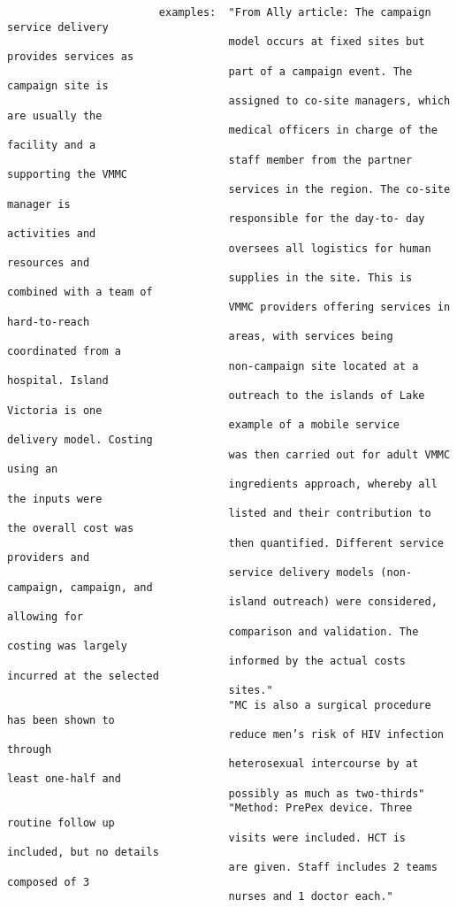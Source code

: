 \documentclass{article}
\begin{document}
\begin{verbatim}
                        examples:  "From Ally article: The campaign service delivery
                                   model occurs at fixed sites but provides services as
                                   part of a campaign event. The campaign site is
                                   assigned to co-site managers, which are usually the
                                   medical officers in charge of the facility and a
                                   staff member from the partner supporting the VMMC
                                   services in the region. The co-site manager is
                                   responsible for the day-to- day activities and
                                   oversees all logistics for human resources and
                                   supplies in the site. This is combined with a team of
                                   VMMC providers offering services in hard-to-reach
                                   areas, with services being coordinated from a
                                   non-campaign site located at a hospital. Island
                                   outreach to the islands of Lake Victoria is one
                                   example of a mobile service delivery model. Costing
                                   was then carried out for adult VMMC using an
                                   ingredients approach, whereby all the inputs were
                                   listed and their contribution to the overall cost was
                                   then quantified. Different service providers and
                                   service delivery models (non-campaign, campaign, and
                                   island outreach) were considered, allowing for
                                   comparison and validation. The costing was largely
                                   informed by the actual costs incurred at the selected
                                   sites."
                                   "MC is also a surgical procedure has been shown to
                                   reduce men’s risk of HIV infection through
                                   heterosexual intercourse by at least one-half and
                                   possibly as much as two-thirds"
                                   "Method: PrePex device. Three routine follow up
                                   visits were included. HCT is included, but no details
                                   are given. Staff includes 2 teams composed of 3
                                   nurses and 1 doctor each."

\end{verbatim}
\end{document}
